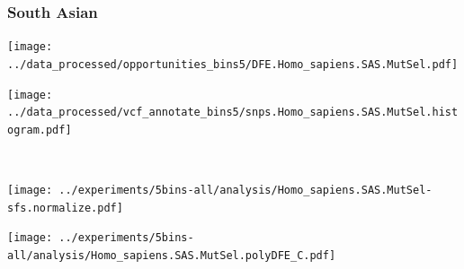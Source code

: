 \subsubsection{South Asian}

\begin{minipage}{0.49\linewidth}
    \texttt{[image: ../data\_processed/opportunities\_bins5/DFE.Homo\_sapiens.SAS.MutSel.pdf]}
\end{minipage}
\begin{minipage}{0.49\linewidth}
    \texttt{[image: ../data\_processed/vcf\_annotate\_bins5/snps.Homo\_sapiens.SAS.MutSel.histogram.pdf]}
\end{minipage}
\\
\begin{minipage}{0.49\linewidth}
    \texttt{[image: ../experiments/5bins-all/analysis/Homo\_sapiens.SAS.MutSel-sfs.normalize.pdf]}
\end{minipage}
\begin{minipage}{0.4\linewidth}
    \texttt{[image: ../experiments/5bins-all/analysis/Homo\_sapiens.SAS.MutSel.polyDFE\_C.pdf]}
\end{minipage}
